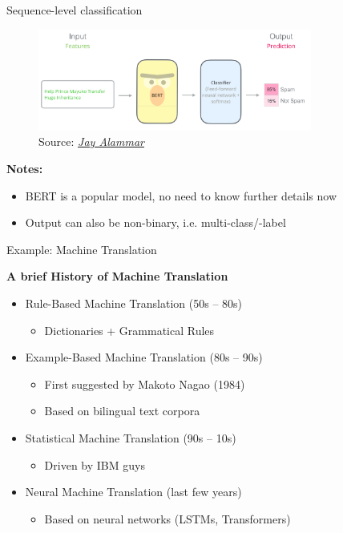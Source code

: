\begin{vbframe}{Sequence-level classification}

\vfill

	\begin{figure}
		\centering
		\includegraphics[width = 9cm]{figure/seqlevel.png}\\ 
		\footnotesize{Source:} \href{https://jalammar.github.io/illustrated-bert/}{\footnotesize \it Jay Alammar}
	\end{figure}
	
\textbf{Notes:}

\begin{itemize}
	\item BERT is a popular model, no need to know further details now 
	\item Output can also be non-binary, i.e. multi-class/-label 
\end{itemize}

\vfill

\end{vbframe}


\begin{vbframe}{Example: Machine Translation}

\vfill

\textbf{A brief History of Machine Translation}

\begin{itemize}
	\item Rule-Based Machine Translation (50s -- 80s)
		\begin{itemize}
			\item Dictionaries + Grammatical Rules
		\end{itemize}
	\item Example-Based Machine Translation (80s -- 90s)
		\begin{itemize}
			\item First suggested by Makoto Nagao (1984)
			\item Based on bilingual text corpora
		\end{itemize}
	\item Statistical Machine Translation (90s -- 10s)
		\begin{itemize}
			\item Driven by IBM guys
		\end{itemize}
	\item Neural Machine Translation (last few years)
		\begin{itemize}
			\item Based on neural networks (LSTMs, Transformers)
		\end{itemize}
\end{itemize}

\vfill

\end{vbframe}

